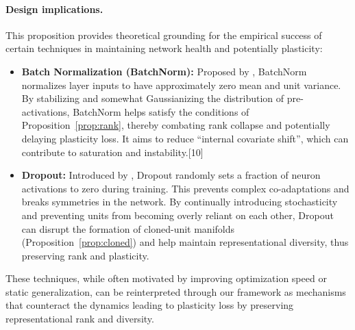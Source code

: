 \documentclass{article}
\begin{document}
\paragraph{Design implications.}
This proposition provides theoretical grounding for the empirical success of certain techniques in maintaining network health and potentially plasticity:
\begin{itemize}
    \item \textbf{Batch Normalization (BatchNorm):} Proposed by \cite{ioffe2015batch}, BatchNorm normalizes layer inputs to have approximately zero mean and unit variance. By stabilizing and somewhat Gaussianizing the distribution of pre-activations, BatchNorm helps satisfy the conditions of Proposition~\ref{prop:rank}, thereby combating rank collapse and potentially delaying plasticity loss. It aims to reduce ``internal covariate shift'', which can contribute to saturation and instability.[10]
    \item \textbf{Dropout:} Introduced by \cite{srivastava2014dropout}, Dropout randomly sets a fraction of neuron activations to zero during training. This prevents complex co-adaptations and breaks symmetries in the network. By continually introducing stochasticity and preventing units from becoming overly reliant on each other, Dropout can disrupt the formation of cloned-unit manifolds (Proposition~\ref{prop:cloned}) and help maintain representational diversity, thus preserving rank and plasticity.
\end{itemize}
These techniques, while often motivated by improving optimization speed or static generalization, can be reinterpreted through our framework as mechanisms that counteract the dynamics leading to plasticity loss by preserving representational rank and diversity.
\end{document}
